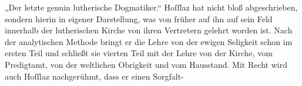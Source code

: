 „Der letzte genuin lutherische Dogmatiker.“ Hoſſlaz hat nicht bloß abgeschrieben, sondern hierin in eigener Darstellung, was von früher auf ihn auf sein Feld innerhalb der lutherischen Kirche von ihren Vertretern gelehrt worden ist. Nach der analytischen Methode bringt er die Lehre von der ewigen Seligkeit schon im ersten Teil und schließt sie vierten Teil mit der Lehre von der Kirche, vom Predigtamt, von der weltlichen Obrigkeit und vom Hausstand. Mit Recht wird auch Hoſſlaz nachgerühmt, dass er einen Sorgfalt-